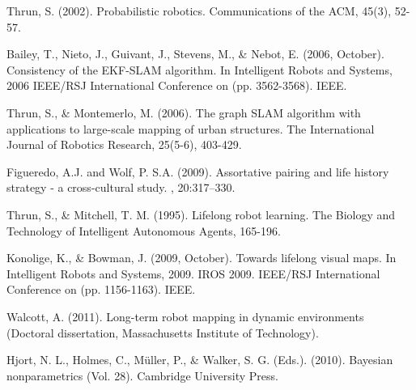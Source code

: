 \documentclass[twoside,hidelinks]{article}
\begin{document}
\begin{thebibliography}{9}

\newblock Thrun, S. (2002). Probabilistic robotics. Communications of the ACM, 45(3), 52-57.


\newblock Bailey, T., Nieto, J., Guivant, J., Stevens, M., \& Nebot, E. (2006, October). Consistency of the EKF-SLAM algorithm. In Intelligent Robots and Systems, 2006 IEEE/RSJ International Conference on (pp. 3562-3568). IEEE.

\newblock Thrun, S., \& Montemerlo, M. (2006). The graph SLAM algorithm with applications to large-scale mapping of urban structures. The International Journal of Robotics Research, 25(5-6), 403-429.

Figueredo, A.J. and Wolf, P. S.A. (2009).
\newblock Assortative pairing and life history strategy - a cross-cultural
  study.
, 20:317--330.

\newblock Thrun, S., \& Mitchell, T. M. (1995). Lifelong robot learning. The Biology and Technology of Intelligent Autonomous Agents, 165-196.

\newblock Konolige, K., \& Bowman, J. (2009, October). Towards lifelong visual maps. In Intelligent Robots and Systems, 2009. IROS 2009. IEEE/RSJ International Conference on (pp. 1156-1163). IEEE.

\newblock Walcott, A. (2011). Long-term robot mapping in dynamic environments (Doctoral dissertation, Massachusetts Institute of Technology).

\newblock Hjort, N. L., Holmes, C., Müller, P., \& Walker, S. G. (Eds.). (2010). Bayesian nonparametrics (Vol. 28). Cambridge University Press.






\end{thebibliography}
\end{document}
